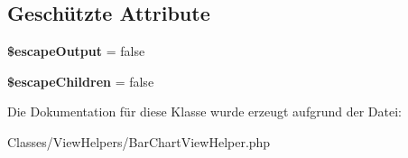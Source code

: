 \subsection*{Geschützte Attribute}
\begin{DoxyCompactItemize}
\item 
\mbox{\label{classCsp_1_1Pinkpoint_1_1ViewHelpers_1_1BarChartViewHelper_ad2a6843ee3a386d0a234991062cc0c27}} 
{\bfseries \$escape\+Output} = false
\item 
\mbox{\label{classCsp_1_1Pinkpoint_1_1ViewHelpers_1_1BarChartViewHelper_a86a47ee58e4580f45fda243de5955395}} 
{\bfseries \$escape\+Children} = false
\end{DoxyCompactItemize}


Die Dokumentation für diese Klasse wurde erzeugt aufgrund der Datei\+:\begin{DoxyCompactItemize}
\item 
Classes/\+View\+Helpers/Bar\+Chart\+View\+Helper.\+php\end{DoxyCompactItemize}
